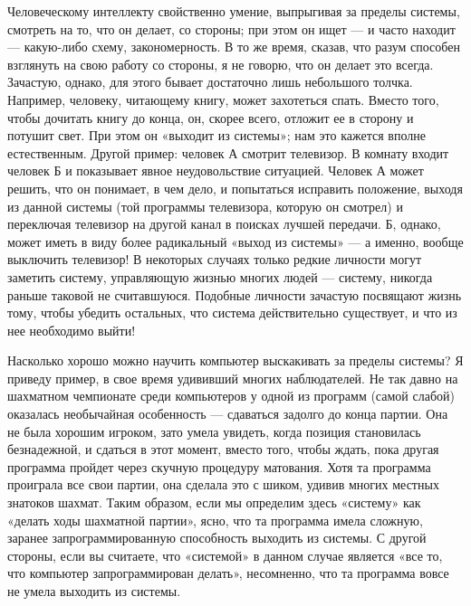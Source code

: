 Человеческому интеллекту свойственно умение, выпрыгивая за пределы системы, смотреть на то, что он делает, со стороны; при этом он ищет --- и часто находит --- какую-либо схему, закономерность. В то же время, сказав, что разум способен взглянуть на свою работу со стороны, я не говорю, что он делает это всегда. Зачастую, однако, для этого бывает достаточно лишь небольшого толчка. Например, человеку, читающему книгу, может захотеться спать. Вместо того, чтобы дочитать книгу до конца, он, скорее всего, отложит ее в сторону и потушит свет. При этом он «выходит из системы»; нам это кажется вполне естественным. Другой пример: человек А смотрит телевизор. В комнату входит человек Б и показывает явное неудовольствие ситуацией. Человек А может решить, что он понимает, в чем дело, и попытаться исправить положение, выходя из данной системы (той программы телевизора, которую он смотрел) и переключая телевизор на другой канал в поисках лучшей передачи. Б, однако, может иметь в виду более радикальный «выход из системы» --- а именно, вообще выключить телевизор! В некоторых случаях только редкие личности могут заметить систему, управляющую жизнью многих людей --- систему, никогда раньше таковой не считавшуюся. Подобные личности зачастую посвящают жизнь тому, чтобы убедить остальных, что система действительно существует, и что из нее необходимо выйти!

Насколько хорошо можно научить компьютер выскакивать за пределы системы? Я приведу пример, в свое время удививший многих наблюдателей. Не так давно на шахматном чемпионате среди компьютеров у одной из программ (самой слабой) оказалась необычайная особенность --- сдаваться задолго до конца партии. Она не была хорошим игроком, зато умела увидеть, когда позиция становилась безнадежной, и сдаться в этот момент, вместо того, чтобы ждать, пока другая программа пройдет через скучную процедуру матования. Хотя та программа проиграла все свои партии, она сделала это с шиком, удивив многих местных знатоков шахмат. Таким образом, если мы определим здесь «систему» как «делать ходы шахматной партии», ясно, что та программа имела сложную, заранее запрограммированную способность выходить из системы. С другой стороны, если вы считаете, что «системой» в данном случае является «все то, что компьютер запрограммирован делать», несомненно, что та программа вовсе не умела выходить из системы.

